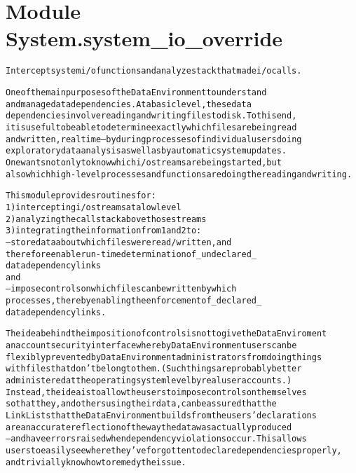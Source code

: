 %
%
%


\section{Module System.system\_io\_override}

    \label{System:system_io_override}
\begin{alltt}

Intercept system i/o functions and analyze stack that made i/o calls. 

One of the main purposes of the Data Environment to understand 
and manage data dependencies.  At a basic level, these data 
dependencies involve reading and writing files to disk.  To this end, 
it is useful to be able to determine exactly which files are being read 
and written, realtime -- by during processes of individual users doing 
exploratory data analysis as well as by automatic system updates.  
One wants not only to know which i/o streams are being started, but
also which high-level processes and functions are doing the reading and writing.    

This module provides routines for:
        1) intercepting i/o streams at a low level
        2) analyzing the call stack above those streams
        3) integrating the information from 1 and 2 to:
                -- store data about which files were read/written, and 
                therefore enable run-time determination of \_undeclared\_ 
                data dependency links
        and 
                -- impose controls on which files can be written by which 
                processes, thereby enabling the enforcement of \_declared\_ 
                data dependency links. 
        
The idea behind the imposition of controls is not to give the Data Enviroment 
an account security interface whereby Data Environment users can be 
flexibly prevented by Data Environment administrators from doing things
with files that don't belong to them. (Such things are probably better 
administered at the operating system level by real user accounts.)  
Instead, the idea is to allow the users to impose controls on themselves 
so that they, and others using their data, can be assured that the 
LinkLists that the Data Environment builds from the users' declarations
are an accurate reflection of the way the data was actually produced 
-- and have errors raised when dependency violations occur.  This allows 
users to easily see where they've forgotten to declare dependencies properly, 
and trivially know how to remedy the issue. 


\end{alltt}
